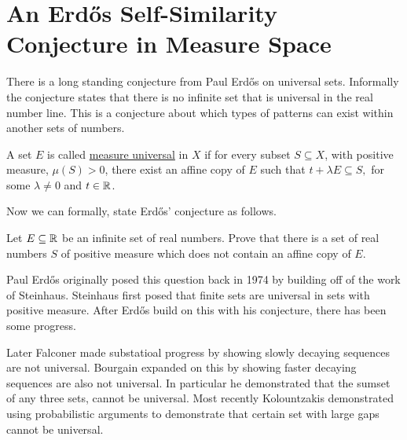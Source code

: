 \section{An Erd\H{o}s Self\hyphen{Similarity} Conjecture in Measure Space}
There is a long standing conjecture from Paul Erd\H{o}s on universal sets.  Informally the conjecture states that there is no infinite set that is universal in the real number line.  This is a conjecture about which types of  patterns can exist within another sets of numbers.  


\begin{definition}
    A set $E$ is called \underline{measure universal} in $X$ if for every subset $S \subseteq X$, with positive measure, $\mu (S) > 0$, there exist an affine copy of $E$ such that $t+\lambda E \subseteq S,$ for some $\lambda \neq 0$ and $t \in \mathbb{R}$.  
\end{definition}

Now we can formally, state Erd\H{o}s' conjecture as follows. 

\begin{conjecture}\label{ErdConj}
    Let $E\subseteq \mathbb{R}$ be an infinite set of real numbers.  Prove that there is a set of real numbers $S$ of positive measure which does not contain an affine copy of $E$.  
\end{conjecture}

Paul Erd\H{o}s originally posed this question back in 1974 by building off of the work of Steinhaus.  Steinhaus\cite{Steinhaus} first posed that finite sets are universal in sets with positive measure.  After Erd\H{o}s build on this with his conjecture, there has been some progress.

Later Falconer \cite{Falconer} made substatioal progress by showing slowly decaying sequences are not universal.  Bourgain \cite{Bourgain} expanded on this by showing faster decaying sequences are also not universal.  In particular he demonstrated that the sumset of any three sets, cannot be universal.  Most recently Kolountzakis \cite{Kolo} demonstrated using probabilistic arguments to demonstrate that certain set with large gaps cannot be universal.  


